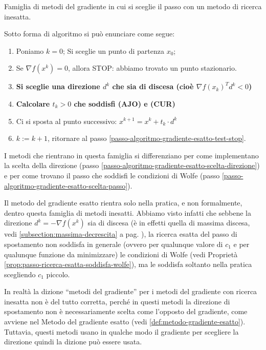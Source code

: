 \begin{defn}
\label{def:metodo-gradiente-inesatto} Famiglia di metodi del gradiente
in cui si sceglie il passo con un metodo di ricerca inesatta.

Sotto forma di algoritmo si può enunciare come segue:
\begin{enumerate}
\item Poniamo $k=0$; Si sceglie un punto di partenza $x_0$;
\item Se $\nabla f(x^{k})=0$, allora STOP: abbiamo trovato un punto
stazionario.
\item \textbf{Si sceglie una direzione $d^k$ che sia di discesa (cio\`e
$\nabla f(x_k)^T d^k < 0$)}
\item \textbf{Calcolare $t_k > 0$ che soddisfi (AJO) e (CUR)}
\item Ci si sposta al punto successivo: $x^{k+1} = x^{k} + t_k \cdot
d^k$
\item $k:=k+1$, ritornare al passo
\ref{passo-algoritmo-gradiente-esatto-test-stop}.
\end{enumerate}

I metodi che rientrano in questa famiglia si differenziano per come
implementano la scelta della direzione (passo
\ref{passo-algoritmo-gradiente-esatto-scelta-direzione}) e per come
trovano il passo che soddisfi le condizioni di Wolfe (passo
\ref{passo-algoritmo-gradiente-esatto-scelta-passo}).
\end{defn}

\begin{notes} Il metodo del gradiente esatto rientra solo nella
pratica, e non formalmente, dentro questa famiglia di metodi
inesatti. Abbiamo visto infatti che sebbene la direzione $d^k = -
\nabla f (x^k)$ sia di discesa (\`e in effetti quella di massima
discesa, vedi \ref{subsection:massima-decrescita} a
pag. \pageref{subsection:massima-decrescita}), la ricerca esatta del
passo di spostamento non soddisfa in generale (ovvero per qualunque
valore di $c_1$ e per qualunque funzione da minimizzare) le condizioni
di Wolfe (vedi Propriet\`a
\ref{prop:passo-ricerca-esatta-soddisfa-wolfe}), ma le soddisfa
soltanto nella pratica scegliendo $c_1$ piccolo.
\end{notes}

\begin{notes} In realt\`a la dizione ``metodi del gradiente'' per i
metodi del gradiente con ricerca inesatta non \`e del tutto corretta,
perch\'e in questi metodi la direzione di spostamento non \`e
necessariamente scelta come l'opposto del gradiente, come avviene nel
Metodo del gradiente esatto (vedi
\ref{def:metodo-gradiente-esatto}). Tuttavia, questi metodi usano in
qualche modo il gradiente per scegliere la direzione quindi la dizione
può essere usata.
\end{notes}

